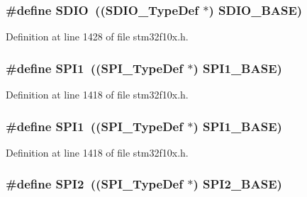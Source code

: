 \subsubsection[{\texorpdfstring{S\+D\+IO}{SDIO}}]{\setlength{\rightskip}{0pt plus 5cm}\#define S\+D\+IO~(({\bf S\+D\+I\+O\+\_\+\+Type\+Def} $\ast$) {\bf S\+D\+I\+O\+\_\+\+B\+A\+SE})}\hypertarget{group___peripheral__declaration_ga8149aa2760fffac16bc75216d5fd9331}{}\label{group___peripheral__declaration_ga8149aa2760fffac16bc75216d5fd9331}


Definition at line 1428 of file stm32f10x.\+h.

\subsubsection[{\texorpdfstring{S\+P\+I1}{SPI1}}]{\setlength{\rightskip}{0pt plus 5cm}\#define S\+P\+I1~(({\bf S\+P\+I\+\_\+\+Type\+Def} $\ast$) {\bf S\+P\+I1\+\_\+\+B\+A\+SE})}\hypertarget{group___peripheral__declaration_gad483be344a28ac800be8f03654a9612f}{}\label{group___peripheral__declaration_gad483be344a28ac800be8f03654a9612f}


Definition at line 1418 of file stm32f10x.\+h.

\subsubsection[{\texorpdfstring{S\+P\+I1}{SPI1}}]{\setlength{\rightskip}{0pt plus 5cm}\#define S\+P\+I1~(({\bf S\+P\+I\+\_\+\+Type\+Def} $\ast$) {\bf S\+P\+I1\+\_\+\+B\+A\+SE})}\hypertarget{group___peripheral__declaration_gad483be344a28ac800be8f03654a9612f}{}\label{group___peripheral__declaration_gad483be344a28ac800be8f03654a9612f}


Definition at line 1418 of file stm32f10x.\+h.

\subsubsection[{\texorpdfstring{S\+P\+I2}{SPI2}}]{\setlength{\rightskip}{0pt plus 5cm}\#define S\+P\+I2~(({\bf S\+P\+I\+\_\+\+Type\+Def} $\ast$) {\bf S\+P\+I2\+\_\+\+B\+A\+SE})}\hypertarget{group___peripheral__declaration_gaf2c3d8ce359dcfbb2261e07ed42af72b}{}\label{group___peripheral__declaration_gaf2c3d8ce359dcfbb2261e07ed42af72b}


